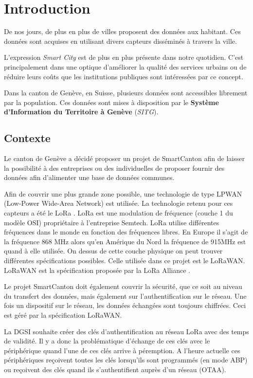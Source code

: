 \chapter{Introduction}
\label{1_introduction}


De nos jours, de plus en plus de villes proposent des données aux habitant. Ces données sont acquises en utilisant divers capteurs disséminés à travers la ville.

L'expression \textit{Smart City} est de plus en plus présente dans notre quotidien. C'est principalement dans une optique d'améliorer la qualité des services urbains ou de réduire leurs coûts que les institutions publiques sont intéressées par ce concept. 



Dans la canton de Genève, en Suisse, plusieurs données sont accessibles librement par la population. Ces données sont mises à disposition par le \textbf{Système d'Information du Territoire à Genève} (\textit{SITG}).




\section{Contexte}

Le canton de Genève a décidé proposer un projet de SmartCanton afin de laisser la possibilité à des entreprises ou des individuelles de proposer fournir des données afin d'alimenter une base de données communes. 

Afin de couvrir une plus grande zone possible, une technologie de type LPWAN (Low-Power Wide-Area Network) est utilisée. La technologie retenu pour ces capteurs a été le LoRa \cite{LPWANWik40:online}. LoRa est une modulation de fréquence (couche 1 du modèle OSI) propriétaire à l'entreprise Semtech. LoRa utilise différentes fréquences dans le monde en fonction des fréquences libres. En Europe il s'agit de la fréquence 868 MHz alors qu'en Amérique du Nord la fréquence de 915MHz est quand à elle utilisée. On dessus de cette couche physique on peut trouver différentes spécifications possibles. Celle utilisée dans ce projet est le LoRaWAN. LoRaWAN est la spécification proposée par la LoRa Alliance \cite{loraalli46:online}. 

Le projet SmartCanton doit également couvrir la sécurité, que ce soit au niveau du transfert des données, mais également sur l'authentification sur le réseau. Une fois un dispositif sur le réseau, les données échangées sont toujours chiffrées. Ceci est géré par la spécification LoRaWAN. 

La DGSI souhaite créer des clés d'authentification au réseau LoRa avec des temps de validité. Il y a donc la problématique d'échange de ces clés avec le périphérique quand l'une de ces clés arrive à péremption. A l'heure actuelle ces périphériques reçoivent toutes les clés lorsqu'ils sont programmés (en mode ABP) ou reçoivent des clés quand ils s'authentifient auprès d'un réseau (OTAA). 



